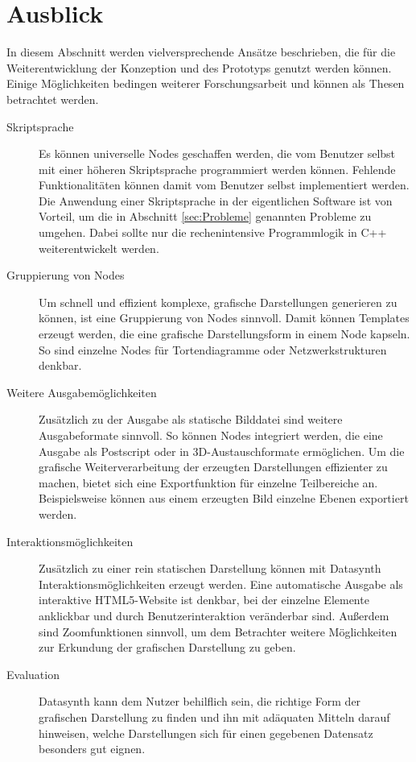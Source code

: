 \documentclass[a4paper, 
               12pt,
               DIV=calc,
               version=first,
               pdftex,
               headsepline,
               footsepline,
               bibliography=totocnumbered,
               listof=numbered]{scrreprt}
\begin{document}
\section{Ausblick}
\label{sec:Ausblick}
In diesem Abschnitt werden vielversprechende Ansätze beschrieben, die für die Weiterentwicklung
der Konzeption und des Prototyps genutzt werden können. Einige Möglichkeiten bedingen weiterer 
Forschungsarbeit und können als Thesen betrachtet werden.
\begin{description}
\item[Skriptsprache]
Es können universelle Nodes geschaffen werden, die vom Benutzer selbst mit einer höheren
Skriptsprache programmiert werden können. Fehlende Funktionalitäten
können damit vom Benutzer selbst implementiert werden.
Die Anwendung einer Skriptsprache in der eigentlichen Software ist von Vorteil, um die in
Abschnitt \ref{sec:Probleme} genannten Probleme zu umgehen. Dabei sollte nur
die rechenintensive Programmlogik in C++ weiterentwickelt werden.
\item[Gruppierung von Nodes]
Um schnell und effizient komplexe, grafische Darstellungen generieren zu können,
ist eine Gruppierung von Nodes sinnvoll. Damit können Templates erzeugt werden,
die eine grafische Darstellungsform in einem Node kapseln. So sind einzelne Nodes
für Tortendiagramme oder Netzwerkstrukturen denkbar.
\item[Weitere Ausgabemöglichkeiten]
Zusätzlich zu der Ausgabe als statische Bilddatei sind weitere Ausgabeformate sinnvoll.
So können Nodes integriert werden, die eine Ausgabe als Postscript oder
in 3D-Austauschformate ermöglichen. Um die grafische Weiterverarbeitung der erzeugten
Darstellungen effizienter zu machen, bietet sich eine Exportfunktion für einzelne Teilbereiche
an. Beispielsweise können aus einem erzeugten Bild einzelne Ebenen exportiert werden.
\item[Interaktionsmöglichkeiten]
Zusätzlich zu einer rein statischen Darstellung können mit Datasynth
Interaktionsmöglichkeiten erzeugt werden. Eine automatische
Ausgabe als interaktive HTML5-Website ist denkbar, bei der einzelne Elemente
anklickbar und durch Benutzerinteraktion veränderbar sind. Außerdem sind 
Zoomfunktionen sinnvoll, um dem Betrachter weitere Möglichkeiten zur
Erkundung der grafischen Darstellung zu geben.
\item[Evaluation]
Datasynth kann dem Nutzer behilflich sein, die richtige Form
der grafischen Darstellung zu finden und ihn mit adäquaten Mitteln darauf
hinweisen, welche Darstellungen sich für einen gegebenen Datensatz besonders gut eignen.
\end{description}
    
\end{document}
